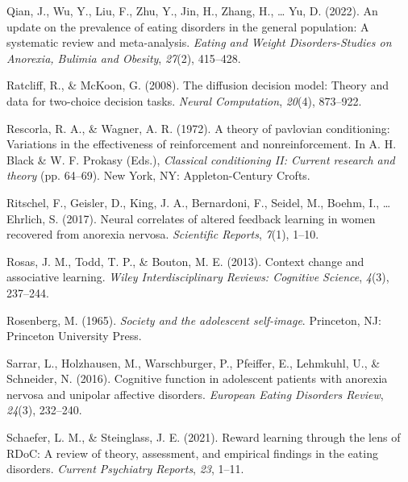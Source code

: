 \documentclass[
  man,floatsintext]{apa6}
\newlength{\cslhangindent}
\newlength{\cslentryspacingunit} %
\newenvironment{CSLReferences}[2] %
 {%
  \setlength{\parindent}{0pt}
  \ifodd #1
  \let\oldpar\par
  \def\par{\hangindent=\cslhangindent\oldpar}
  \fi
  \setlength{\parskip}{#2\cslentryspacingunit}
 }%
 {}
\begin{document}
\begin{CSLReferences}{1}{0}
\leavevmode{}%
Qian, J., Wu, Y., Liu, F., Zhu, Y., Jin, H., Zhang, H., \ldots{} Yu, D. (2022). An update on the prevalence of eating disorders in the general population: A systematic review and meta-analysis. \emph{Eating and Weight Disorders-Studies on Anorexia, Bulimia and Obesity}, \emph{27}(2), 415--428.

\leavevmode{}%
Ratcliff, R., \& McKoon, G. (2008). The diffusion decision model: Theory and data for two-choice decision tasks. \emph{Neural Computation}, \emph{20}(4), 873--922.

\leavevmode{}%
Rescorla, R. A., \& Wagner, A. R. (1972). A theory of pavlovian conditioning: Variations in the effectiveness of reinforcement and nonreinforcement. In A. H. Black \& W. F. Prokasy (Eds.), \emph{Classical conditioning II: Current research and theory} (pp. 64--69). New York, NY: Appleton-Century Crofts.

\leavevmode{}%
Ritschel, F., Geisler, D., King, J. A., Bernardoni, F., Seidel, M., Boehm, I., \ldots{} Ehrlich, S. (2017). Neural correlates of altered feedback learning in women recovered from anorexia nervosa. \emph{Scientific Reports}, \emph{7}(1), 1--10.

\leavevmode{}%
Rosas, J. M., Todd, T. P., \& Bouton, M. E. (2013). Context change and associative learning. \emph{Wiley Interdisciplinary Reviews: Cognitive Science}, \emph{4}(3), 237--244.

\leavevmode{}%
Rosenberg, M. (1965). \emph{Society and the adolescent self-image}. Princeton, NJ: Princeton University Press.

\leavevmode{}%
Sarrar, L., Holzhausen, M., Warschburger, P., Pfeiffer, E., Lehmkuhl, U., \& Schneider, N. (2016). Cognitive function in adolescent patients with anorexia nervosa and unipolar affective disorders. \emph{European Eating Disorders Review}, \emph{24}(3), 232--240.

\leavevmode{}%
Schaefer, L. M., \& Steinglass, J. E. (2021). Reward learning through the lens of RDoC: A review of theory, assessment, and empirical findings in the eating disorders. \emph{Current Psychiatry Reports}, \emph{23}, 1--11.


\end{CSLReferences}
\end{document}
